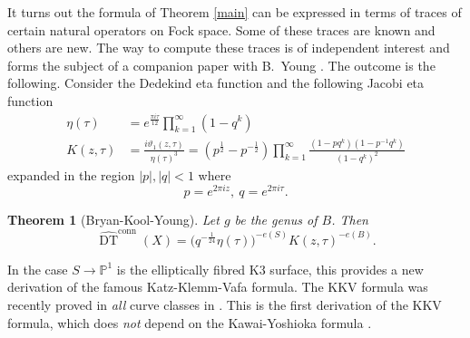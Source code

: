 \documentclass{amsart}
\newtheorem{theorem}{Theorem}%
\theoremstyle{definition}
\newcommand{\PP} {\mathbb{P}}
\newcommand{\DT}{\operatorname{DT}}
\newcommand{\conn}{\operatorname{conn}}
\begin{document}
It turns out the formula of Theorem \ref{main} can be expressed in terms of traces of certain natural operators on Fock space. Some of these traces are known and others are new. The way to compute these traces is of independent interest and forms the subject of a companion paper with B.~Young \cite{BKY}. The outcome is the following. Consider the Dedekind eta function and the following Jacobi eta function \cite{Cha}
\begin{align*}
\eta(\tau) &= e^{\frac{\pi i \tau}{12}}\prod_{k=1}^{\infty}(1-q^k) \\
K(z,\tau) &= \frac{i \vartheta_1(z,\tau)}{\eta(\tau)^3} = (p^{\frac{1}{2}} - p^{-\frac{1}{2}}) \prod_{k=1}^{\infty} \frac{(1-p q^k) (1-p^{-1} q^k)}{(1-q^k)^2}
\end{align*}
expanded in the region $|p|, |q| <1$ where 
$$
p = e^{2 \pi i z}, \ q = e^{2 \pi i \tau}.
$$
\begin{theorem}[Bryan-Kool-Young] 
Let $g$ be the genus of $B$. Then 
$$
\widehat{\DT}^{\conn}(X) = \big(q^{-\frac{1}{24}}\eta(\tau) \big)^{-e(S)} K(z,\tau)^{-e(B)}.
$$
\end{theorem}
In the case $S \rightarrow \PP^1$ is the elliptically fibred K3 surface, this provides a new derivation of the famous Katz-Klemm-Vafa formula. The KKV formula was recently proved in \emph{all} curve classes in \cite{PT}. This is the first derivation of the KKV formula, which does \emph{not} depend on the Kawai-Yoshioka formula \cite{KY}.
\end{document}
